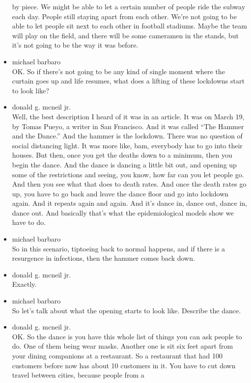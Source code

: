 \begin{itemize}
  by piece. We might be able to let a certain number of people ride the
  subway each day. People still staying apart from each other. We're not
  going to be able to let people sit next to each other in football
  stadiums. Maybe the team will play on the field, and there will be
  some cameramen in the stands, but it's not going to be the way it was
  before.
\item
  michael barbaro\\
  OK. So if there's not going to be any kind of single moment where the
  curtain goes up and life resumes, what does a lifting of these
  lockdowns start to look like?
\item
  donald g. mcneil jr.\\
  Well, the best description I heard of it was in an article. It was on
  March 19, by Tomas Pueyo, a writer in San Francisco. And it was called
  ``The Hammer and the Dance.'' And the hammer is the lockdown. There
  was no question of social distancing light. It was more like, bam,
  everybody has to go into their houses. But then, once you get the
  deaths down to a minimum, then you begin the dance. And the dance is
  dancing a little bit out, and opening up some of the restrictions and
  seeing, you know, how far can you let people go. And then you see what
  that does to death rates. And once the death rates go up, you have to
  go back and leave the dance floor and go into lockdown again. And it
  repeats again and again. And it's dance in, dance out, dance in, dance
  out. And basically that's what the epidemiological models show we have
  to do.
\item
  michael barbaro\\
  So in this scenario, tiptoeing back to normal happens, and if there is
  a resurgence in infections, then the hammer comes back down.
\item
  donald g. mcneil jr.\\
  Exactly.
\item
  michael barbaro\\
  So let's talk about what the opening starts to look like. Describe the
  dance.
\item
  donald g. mcneil jr.\\
  OK. So the dance is you have this whole list of things you can ask
  people to do. One of them being wear masks. Another one is sit six
  feet apart from your dining companions at a restaurant. So a
  restaurant that had 100 customers before now has about 10 customers in
  it. You have to cut down travel between cities, because people from a

\end{itemize}

